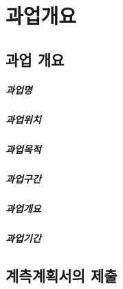 




	\chapter{과업개요}
	\minitoc				%


	\section{과업 개요}

		\paragraph{과업명}
		
		\paragraph{과업위치}
		
		\paragraph{과업목적}
		
		\paragraph{과업구간}
		
		\paragraph{과업개요}
		
		\paragraph{과업기간}
		
		
	\section{계측계획서의 제출}


